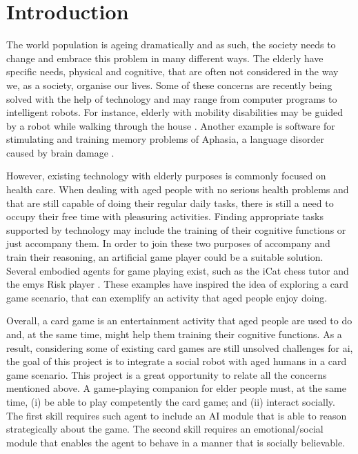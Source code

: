 \section{Introduction}
\label{sec:introduction}

The world population is ageing dramatically and as such, the society needs to change and embrace this problem in many different ways. The elderly have specific needs, physical and cognitive, that are often not considered in the way we, as a society, organise our lives.  
Some of these concerns are recently being solved with the help of technology and may range from computer programs to intelligent robots.
For instance, elderly with mobility disabilities may be guided by a robot while walking through the house \cite{Pollack2002}.
Another example is software for stimulating and training memory problems of Aphasia, a language disorder caused by brain damage \cite{Pompili2011}.

However, existing technology with elderly purposes is commonly focused on health care.
When dealing with aged people with no serious health problems and that are still capable of doing their regular daily tasks, there is still a need to occupy their free time with pleasuring activities.
Finding appropriate tasks supported by technology may include the training of their cognitive functions or just accompany them.
In order to join these two purposes of accompany and train their reasoning, an artificial game player could be a suitable solution.
Several embodied agents for game playing exist, such as the iCat chess tutor \cite{Affective2007} and the \ac{emys} Risk player \cite{Pereira}.%
These examples have inspired the idea of exploring a card game scenario, that can exemplify an activity that aged people enjoy doing.

Overall, a card game is an entertainment activity that aged people are used to do and, at the same time, might help them training their cognitive functions.
As a result, considering some of existing card games are still unsolved challenges for \ac{ai}, the goal of this project is to integrate a social robot with aged humans in a card game scenario.
This project is a great opportunity to relate all the concerns mentioned above.
A game-playing companion for elder people must, at the same time, (i) be able to play competently the card game; and (ii) interact socially. The first skill requires such agent to include an AI module that is able to reason strategically about the game. The second skill requires an emotional/social module that enables the agent to behave in a manner that is socially believable.


